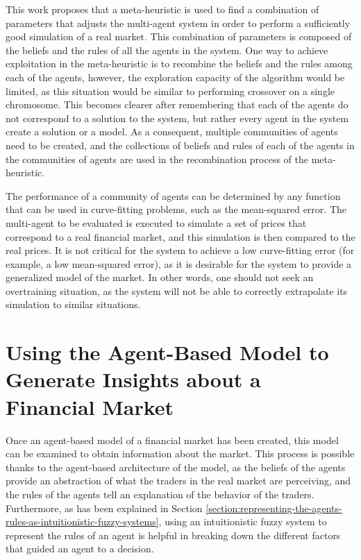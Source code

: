 This work proposes that a meta-heuristic is used to find a combination of
parameters that adjusts the multi-agent system in order to perform a
sufficiently good simulation of a real market. This combination of parameters is
composed of the beliefs and the rules of all the agents in the system. One way
to achieve exploitation in the meta-heuristic is to recombine the beliefs and
the rules among each of the agents, however, the exploration capacity of the
algorithm would be limited, as this situation would be similar to performing
crossover on a single chromosome. This becomes clearer after remembering that
each of the agents do not correspond to a solution to the system, but rather
every agent in the system create a solution or a model. As a consequent,
multiple communities of agents need to be created, and the collections of
beliefs and rules of each of the agents in the communities of agents are used in
the recombination process of the meta-heuristic.

The performance of a community of agents can be determined by any function that
can be used in curve-fitting problems, such as the mean-squared error. The
multi-agent to be evaluated is executed to simulate a set of prices that
correspond to a real financial market, and this simulation is then compared to
the real prices. It is not critical for the system to achieve a low
curve-fitting error (for example, a low mean-squared error), as it is desirable
for the system to provide a generalized model of the market. In other words, one
should not seek an overtraining situation, as the system will not be able to
correctly extrapolate its simulation to similar situations.

\section{Using the Agent-Based Model to Generate Insights about a Financial
Market}
\label{section:using-the-agent-based-model-to-generate-insights-about-a-financial-market}

Once an agent-based model of a financial market has been created, this model can
be examined to obtain information about the market. This process is possible
thanks to the agent-based architecture of the model, as the beliefs of the
agents provide an abstraction of what the traders in the real market are
perceiving, and the rules of the agents tell an explanation of the behavior of
the traders. Furthermore, as has been explained in Section
\ref{section:representing-the-agents-rules-as-intuitionistic-fuzzy-systems},
using an intuitionistic fuzzy system to represent the rules of an agent is
helpful in breaking down the different factors that guided an agent to a
decision.

